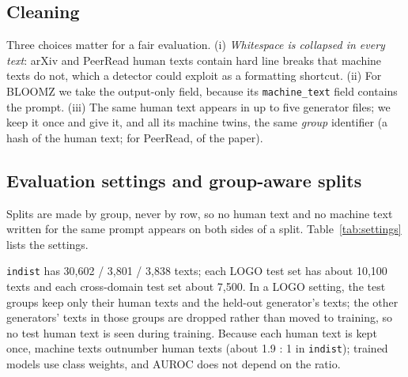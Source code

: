 \documentclass{nle}
\begin{document}
\subsection{Cleaning}
Three choices matter for a fair evaluation. (i) \emph{Whitespace is collapsed in every text}: arXiv and PeerRead human
texts contain hard line breaks that machine texts do not, which a detector could exploit as a formatting shortcut.
(ii) For BLOOMZ we take the output-only field, because its \texttt{machine\_text} field contains the prompt.
(iii) The same human text appears in up to five generator files; we keep it once and give it, and all its machine
twins, the same \emph{group} identifier (a hash of the human text; for PeerRead, of the paper).

\subsection{Evaluation settings and group-aware splits}
Splits are made by group, never by row, so no human text and no machine text written for the same prompt appears on
both sides of a split. Table~\ref{tab:settings} lists the settings.

\begin{table}
  \caption{Evaluation settings. All splits are by group. Sizes from \texttt{results/data\_audit.md}.}
  \label{tab:settings}
\end{table}

\texttt{indist} has 30,602 / 3,801 / 3,838 texts; each LOGO test set has about 10,100 texts and each cross-domain
test set about 7,500. In a LOGO setting, the test groups keep only their human texts and the held-out generator's
texts; the other generators' texts in those groups are dropped rather than moved to training, so no test human text is
seen during training. Because each human text is kept once, machine texts outnumber human texts (about 1.9 : 1 in
\texttt{indist}); trained models use class weights, and AUROC does not depend on the ratio.
\end{document}
